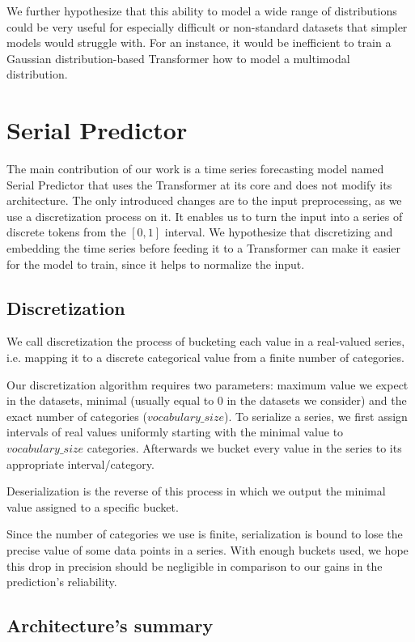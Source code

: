 \documentclass[en]{pracamgr}
\begin{document}
	We further hypothesize that this ability to model a wide range of distributions could be very useful for especially difficult or non-standard datasets that simpler models would struggle with. For an instance, it would be inefficient to train a Gaussian distribution-based Transformer how to model a multimodal distribution.
	
	\section{Serial Predictor}
	The main contribution of our work is a time series forecasting model named Serial Predictor that uses the Transformer at its core and does not modify its architecture. The only introduced changes are to the input preprocessing, as we use a discretization process on it. It enables us to turn the input into a series of discrete tokens from the $[0, 1]$ interval. We hypothesize that discretizing and embedding the time series before feeding it to a Transformer can make it easier for the model to train, since it helps to normalize the input.
	
	
	\subsection{Discretization}\label{s:disc}
	
	
	We call discretization the process of bucketing each value in a real-valued series, i.e. mapping it to a discrete categorical value from a finite number of categories.
	
	Our discretization algorithm requires two parameters: maximum value we expect in the datasets, minimal (usually equal to 0 in the datasets we consider) and the exact number of categories ($vocabulary\_size$).
	To serialize a series, we first assign intervals of real values uniformly starting with the minimal value to $vocabulary\_size$ categories.
	Afterwards we bucket every value in the series to its appropriate interval/category.
	
	
	Deserialization is the reverse of this process in which we output the minimal value assigned to a specific bucket. 
	
	Since the number of categories we use is finite, serialization is bound to lose the precise value of some data points in a series. With enough buckets used, we hope this drop in precision should be negligible in comparison to our gains in the prediction's reliability. 
	
	\subsection{Architecture's summary}
	
\end{document}
